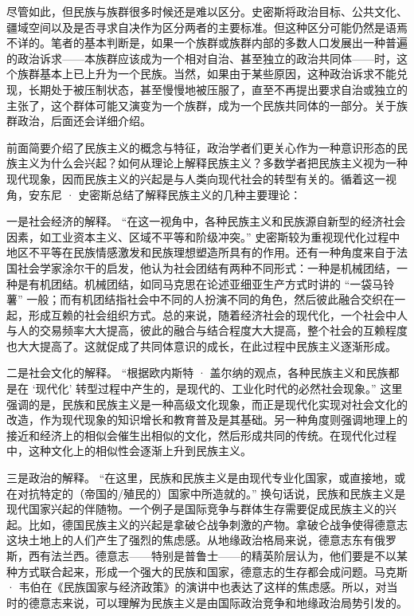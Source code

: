 尽管如此，但民族与族群很多时候还是难以区分。史密斯将政治目标、公共文化、疆域空间以及是否寻求自决作为区分两者的主要标准。但这种区分可能仍然是语焉不详的。笔者的基本判断是，如果一个族群或族群内部的多数人口发展出一种普遍的政治诉求——本族群应该成为一个相对自治、甚至独立的政治共同体——时，这个族群基本上已上升为一个民族。当然，如果由于某些原因，这种政治诉求不能兑现，长期处于被压制状态，甚至慢慢地被压服了，直至不再提出要求自治或独立的主张了，这个群体可能又演变为一个族群，成为一个民族共同体的一部分。关于族群政治，后面还会详细介绍。


前面简要介绍了民族主义的概念与特征，政治学者们更关心作为一种意识形态的民族主义为什么会兴起？如何从理论上解释民族主义？多数学者把民族主义视为一种现代现象，因而民族主义的兴起是与人类向现代社会的转型有关的。循着这一视角，安东尼 · 史密斯总结了解释民族主义的几种主要理论：

一是社会经济的解释。 “在这一视角中，各种民族主义和民族源自新型的经济社会因素，如工业资本主义、区域不平等和阶级冲突。” 史密斯较为重视现代化过程中地区不平等在民族情感激发和民族理想塑造所具有的作用。还有一种角度来自于法国社会学家涂尔干的启发，他认为社会团结有两种不同形式：一种是机械团结，一种是有机团结。机械团结，如同马克思在论述亚细亚生产方式时讲的 “一袋马铃薯” 一般；而有机团结指社会中不同的人扮演不同的角色，然后彼此融合交织在一起，形成互赖的社会组织方式。总的来说，随着经济社会的现代化，一个社会中人与人的交易频率大大提高，彼此的融合与结合程度大大提高，整个社会的互赖程度也大大提高了。这就促成了共同体意识的成长，在此过程中民族主义逐渐形成。

二是社会文化的解释。 “根据欧内斯特 · 盖尔纳的观点，各种民族主义和民族都是在 ‘现代化’ 转型过程中产生的，是现代的、工业化时代的必然社会现象。” 这里强调的是，民族和民族主义是一种高级文化现象，而正是现代化实现对社会文化的改造，作为现代现象的知识增长和教育普及是其基础。另一种角度则强调地理上的接近和经济上的相似会催生出相似的文化，然后形成共同的传统。在现代化过程中，这种文化上的相似性会逐渐上升到民族主义。

三是政治的解释。 “在这里，民族和民族主义是由现代专业化国家，或直接地，或在对抗特定的（帝国的/殖民的）国家中所造就的。” 换句话说，民族和民族主义是现代国家兴起的伴随物。一个例子是国际竞争与群体生存需要促成民族主义的兴起。比如，德国民族主义的兴起是拿破仑战争刺激的产物。拿破仑战争使得德意志这块土地上的人们产生了强烈的焦虑感。从地缘政治格局来说，德意志东有俄罗斯，西有法兰西。德意志——特别是普鲁士——的精英阶层认为，他们要是不以某种方式联合起来，形成一个强大的民族和国家，德意志的生存都会成问题。马克斯 · 韦伯在《民族国家与经济政策》的演讲中也表达了这样的焦虑感。所以，对当时的德意志来说，可以理解为民族主义是由国际政治竞争和地缘政治局势引发的。

